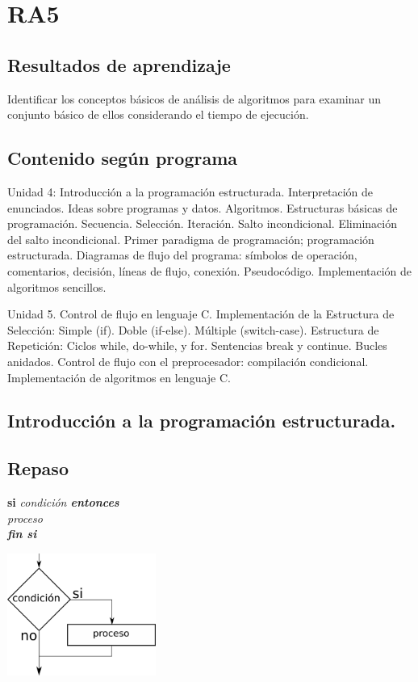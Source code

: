 \section{RA5}
\subsection*{Resultados de aprendizaje}
Identificar los conceptos básicos de análisis de algoritmos para examinar un conjunto básico de ellos considerando el tiempo de ejecución.

\subsection*{Contenido según programa}
Unidad 4: Introducción a la programación estructurada.  Interpretación de enunciados. Ideas sobre programas y datos.  Algoritmos. Estructuras básicas de programación.  Secuencia. Selección.  Iteración. Salto incondicional. Eliminación del salto incondicional.  Primer paradigma de programación; programación estructurada.  Diagramas de flujo del programa: símbolos de operación, comentarios, decisión, líneas de flujo, conexión. Pseudocódigo.  Implementación de algoritmos sencillos.

Unidad 5. Control de flujo en lenguaje C.  Implementación de la Estructura de Selección: Simple (if). Doble (if-else).  Múltiple (switch-case).  Estructura de Repetición: Ciclos while, do-while, y for.  Sentencias break y continue. Bucles anidados.  Control de flujo con el preprocesador: compilación condicional. Implementación de algoritmos en lenguaje C.

\subsection*{Introducción a la programación estructurada.}
\subsection*{Repaso}

\begin{minipage}{0.5\textwidth}
  \textbf{si} \it{condición} \textbf{entonces}\\
  \hspace*{10mm}\it{proceso}\\
  \textbf{fin si}\\
\end{minipage}
\begin{minipage}{0.5\textwidth}
\center
  \includegraphics[height=40mm]{img/if.pdf}
\end{minipage}

